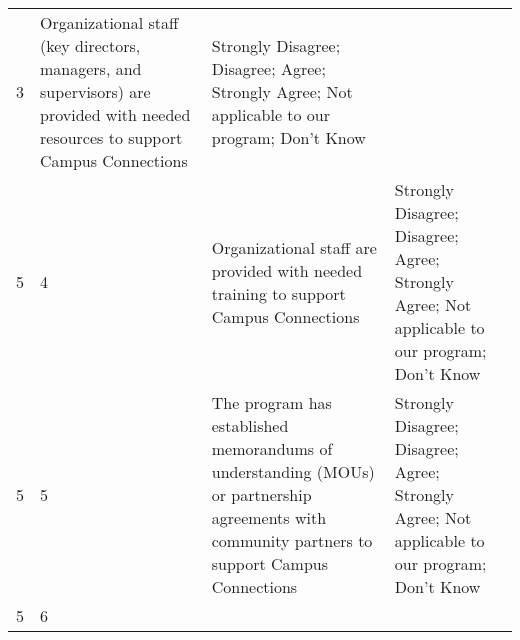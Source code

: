 \documentclass[]{article}
\begin{document}
\begin{longtable}[]{@{}llll@{}}
\begin{minipage}[t]{0.04\columnwidth}
3\strut
\end{minipage} & \begin{minipage}[t]{0.40\columnwidth}\raggedright\strut
Organizational staff (key directors, managers, and supervisors) are
provided with needed resources to support Campus Connections\strut
\end{minipage} & \begin{minipage}[t]{0.40\columnwidth}\raggedright\strut
Strongly Disagree; Disagree; Agree; Strongly Agree; Not applicable to
our program; Don't Know\strut
\end{minipage}\tabularnewline
\begin{minipage}[t]{0.05\columnwidth}\raggedright\strut
5\strut
\end{minipage} & \begin{minipage}[t]{0.04\columnwidth}\raggedright\strut
4\strut
\end{minipage} & \begin{minipage}[t]{0.40\columnwidth}\raggedright\strut
Organizational staff are provided with needed training to support Campus
Connections\strut
\end{minipage} & \begin{minipage}[t]{0.40\columnwidth}\raggedright\strut
Strongly Disagree; Disagree; Agree; Strongly Agree; Not applicable to
our program; Don't Know\strut
\end{minipage}\tabularnewline
\begin{minipage}[t]{0.05\columnwidth}\raggedright\strut
5\strut
\end{minipage} & \begin{minipage}[t]{0.04\columnwidth}\raggedright\strut
5\strut
\end{minipage} & \begin{minipage}[t]{0.40\columnwidth}\raggedright\strut
The program has established memorandums of understanding (MOUs) or
partnership agreements with community partners to support Campus
Connections\strut
\end{minipage} & \begin{minipage}[t]{0.40\columnwidth}\raggedright\strut
Strongly Disagree; Disagree; Agree; Strongly Agree; Not applicable to
our program; Don't Know\strut
\end{minipage}\tabularnewline
\begin{minipage}[t]{0.05\columnwidth}\raggedright\strut
5\strut
\end{minipage} & \begin{minipage}[t]{0.04\columnwidth}\raggedright\strut
6\strut

\end{minipage}
\end{longtable}
\end{document}
